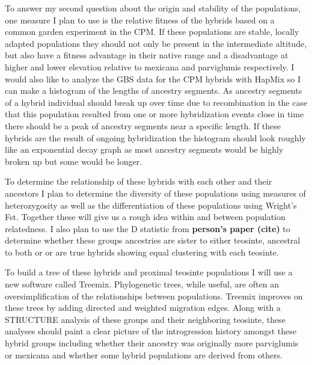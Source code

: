 \documentclass[12pt]{amsart}
\begin{document}
To answer my second question about the origin and stability of the populations, one measure I plan to use is the relative fitness of the hybrids based on a common garden experiment in the CPM. 
If these populations are stable, locally adapted populations they should not only be present in the intermediate altitude, but also have a fitness advantage in their native range and a disadvantage at higher and lower elevation relative to mexicana and parviglumis respectively.
I would also like to analyze the GBS data for the CPM hybrids with HapMix so I can make a histogram of the lengths of ancestry segments.  
As ancestry segments of a hybrid individual should break up over time due to recombination in the case that this population resulted from one or more hybridization events close in time there should be a peak of ancestry segments near a specific length.
If these hybrids are the result of ongoing hybridization the histogram should look roughly like an exponential decay graph as most ancestry segments would be highly broken up but some would be longer.%

To determine the relationship of these hybrids with each other and their ancestors I plan to determine the diversity of these populations using measures of heterozygosity as well as the differentiation of these populations using Wright's Fst.  
Together these will give us a rough idea within and between population relatedness.
I also plan to use the D statistic from \textbf{person's paper (cite)} to determine whether these groups ancestries are sister to either teosinte, ancestral to both or or are true hybrids showing equal clustering with each teosinte.

To build a tree of these hybrids and proximal teosinte populations I will use a new software called Treemix.
Phylogenetic trees, while useful, are often an oversimplification of the relationships between populations.%
Treemix improves on these trees by adding directed and weighted migration edges.%
Along with a STRUCTURE analysis of these groups and their neighboring teosinte, these analyses should paint a clear picture of the introgression history amongst these hybrid groups including whether their ancestry was originally more parviglumis or mexicana and whether some hybrid populations are derived from others.
\end{document}
